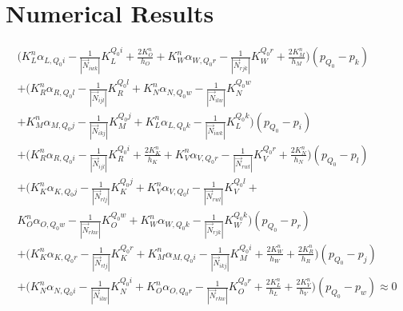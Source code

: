 \documentclass{article}
\begin{document}
\section{Numerical Results}	
	\begin{equation}
		\begin{split}
 \Bigg(K_{L}^{n}\alpha_{L,Q_{0}i} - \frac{1}{|\vec{N}_{iwk}|}K_{L}^{Q_{0}i}+\frac{2K_{O}^{n}}{h_{O}}+K_{W}^{n}\alpha_{W,Q_{0}r} - \frac{1}{|\vec{N}_{rjk}|}K_{W}^{Q_{0}r}+\frac{2K_{M}^{n}}{h_{M}}\Bigg)(p_{Q_{0}} - p_{k})
\\+
	\Bigg(K_{R}^{n}\alpha_{R,Q_{0}l} - \frac{1}{|\vec{N}_{ijl}|}K_{R}^{Q_{0}l}+K_{N}^{n}\alpha_{N,Q_{0}w} - \frac{1}{|\vec{N}_{ilw}|}K_{N}^{Q_{0}w} \\+ K_{M}^{n}\alpha_{M,Q_{0}j} - \frac{1}{|\vec{N}_{ikj}|}K_{M}^{Q_{0}j}+K_{L}^{n}\alpha_{L,Q_{0}k} - \frac{1}{|\vec{N}_{iwk}|}K_{L}^{Q_{0}k}\Bigg)(p_{Q_{0}} - p_{i})
\\+
\Bigg(K_{R}^{n}\alpha_{R,Q_{0}i} - \frac{1}{|\vec{N}_{ijl}|}K_{R}^{Q_{0}i}+\frac{2K_{K}^{n}}{h_{K}}+K_{V}^{n}\alpha_{V,Q_{0}r} - \frac{1}{|\vec{N}_{rwl}|}K_{V}^{Q_{0}r}+\frac{2K_{N}^{n}}{h_{N}}\Bigg)(p_{Q_{0}} - p_{l})
\\+
\Bigg(K_{K}^{n}\alpha_{K,Q_{0}j} - \frac{1}{|\vec{N}_{rlj}|}K_{K}^{Q_{0}j}+K_{V}^{n}\alpha_{V,Q_{0}l} - \frac{1}{|\vec{N}_{rwl}|}K_{V}^{Q_{0}l}+ \\ K_{O}^{n}\alpha_{O,Q_{0}w} - \frac{1}{|\vec{N}_{rkw}|}K_{O}^{Q_{0}w}+K_{W}^{n}\alpha_{W,Q_{0}k} - \frac{1}{|\vec{N}_{rjk}|}K_{W}^{Q_{0}k}\Bigg)(p_{Q_{0}} - p_{r})
\\+
		\Bigg(K_{K}^{n}\alpha_{K,Q_{0}r} - \frac{1}{|\vec{N}_{rlj}|}K_{K}^{Q_{0}r}+K_{M}^{n}\alpha_{M,Q_{0}i} - \frac{1}{|\vec{N}_{ikj}|}K_{M}^{Q_{0}i}+\frac{2K_{W}^{n}}{h_{W}}+\frac{2K_{R}^{n}}{h_{R}}\Bigg)(p_{Q_{0}} - p_{j})
\\+
		\Bigg(K_{N}^{n}\alpha_{N,Q_{0}i} - \frac{1}{|\vec{N}_{ilw}|}K_{N}^{Q_{0}i} + K_{O}^{n}\alpha_{O,Q_{0}r} - \frac{1}{|\vec{N}_{rkw}|}K_{O}^{Q_{0}r}+\frac{2K_{L}^{n}}{h_{L}}+\frac{2K_{V}^{n}}{h_{V}}\Bigg)(p_{Q_{0}} - p_{w})
\approx 0
		\end{split}
		\end{equation}
		
\end{document}
